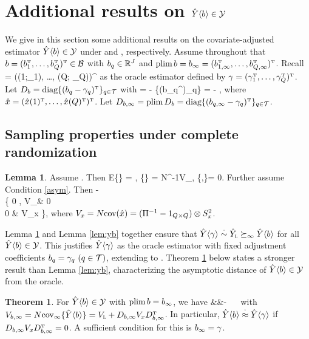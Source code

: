 \documentclass[11pt]{article}
\theoremstyle{definition}
\newtheorem{theorem}{Theorem}
\newtheorem{lemma}{Lemma}
\begin{document}
\section{Additional results on $\hat Y\langle b \rangle\in \mathcal{Y}$}\label{sec:yb_app_add_res}
We give in this section some additional results on the covariate-adjusted estimator $\hat Y\langle b \rangle\in \mathcal{Y}$ under {\cre} and {\rem}, respectively.
Assume throughout that $b = (b_1^{ \mathrm{\scriptscriptstyle T} }, \dots, b_Q^{ \mathrm{\scriptscriptstyle T} })^{ \mathrm{\scriptscriptstyle T} } \in\mathcal{B}$ with $b_q \in \mathbb R^J$ and $\textup{plim\,} b = b_\infty = (b^{ \mathrm{\scriptscriptstyle T} }_{1,\infty}, \ldots, b^{ \mathrm{\scriptscriptstyle T} }_{Q, \infty})^{ \mathrm{\scriptscriptstyle T} }$. %
Recall
\begina
\hyg = (\hy(1;\gamma_1), \ldots, \hy(Q; \gamma_Q))^\T
\enda as the oracle estimator defined by $\gamma =(\gamma_1^{ \mathrm{\scriptscriptstyle T} },\dots, \gamma_Q^{ \mathrm{\scriptscriptstyle T} })^{ \mathrm{\scriptscriptstyle T} }$.
Let 
$D_b   = \text{diag}\{(b_q - \gamma_q)^{ \mathrm{\scriptscriptstyle T} }\}_{q\in\mathcal{T}}$ with  
\begina
\hyba= \hy - \{\diag(b_q^\T)_{q\in\mt}\} \hx =  \hyg - \db   \hx,  
\enda 
where $\hat x = (\hat x(1)^{ \mathrm{\scriptscriptstyle T} }, \ldots, \hat x(Q)^{ \mathrm{\scriptscriptstyle T} })^{ \mathrm{\scriptscriptstyle T} }$. 
Let  
$D_{b, \infty}  = \textup{plim\,} D_b  = \text{diag}\{(b_{q,\infty} - \gamma_q)^{ \mathrm{\scriptscriptstyle T} }\}_{q\in\mathcal{T}}$. 

\subsection{Sampling properties under complete randomization}
\begin{lemma}\label{lem:yg}
Assume {\cre}. Then 
\begina
E\{\hyg\} = \by, \qquad \cov\{\hyg\} =  N^{-1}V_\lin, \qquad \cov\{\hyg ,\hx\}= 0.
\enda
Further assume Condition \ref{asym}. Then 
\begina
\sqrtn \beginp
\hyg - \by\\
\hx
\endp \rs \mn\left\{ 0 , \beginp V_\lin & 0   \\ 0   & V_x \endp \right\},
\enda
where $V_x = N\text{cov}(\hat x) =  (\Pi^{-1}-1_{Q\times Q})  \otimes  S^2_{x}$. 
\end{lemma}

Lemma \ref{lem:yg} and Lemma \ref{lem:yb} together  ensure that $\hat Y\langle\gamma\rangle \overset{\cdot}{\sim} \hat Y_{\textsc{l}} \succeq_\infty \hat Y\langle b \rangle$ for all $\hat Y\langle b \rangle\in\mathcal{Y}$. 
This justifies $\hat Y\langle\gamma\rangle$ as the oracle estimator with fixed adjustment coefficients $b_q = \gamma_q \ ({q\in\mathcal{T}})$, extending \citet[][Example 9]{LD20} to \mes. 
Theorem \ref{thm:optimal_gamma} below states a stronger result than Lemma \ref{lem:yb}, characterizing the asymptotic distance of $\hat Y\langle b \rangle\in \mathcal{Y}$ from the oracle.



\begin{theorem}\label{thm:optimal_gamma} 
{\precre}
For $\hat Y\langle b \rangle\in \mathcal{Y}$ with $\textup{plim\,} b = b_\infty$, we have
\begina
\hyba &\approxi &\hyg - \dbi   \hx  \ \preci \  \hyg
\enda with  $V_{b,\infty} = N\text{cov}_\infty\{\hat Y\langle b \rangle\} = V_{\textsc{l}} + D_{b, \infty} V_x D_{b, \infty}^{ \mathrm{\scriptscriptstyle T} }$. In particular, $\hat Y\langle b \rangle \overset{\cdot}{\approx} \hat Y\langle\gamma\rangle$  if $D_{b, \infty} V_x D_{b, \infty}^{ \mathrm{\scriptscriptstyle T} } = 0$. A sufficient condition for this is $b_\infty = \gamma$.  
\end{theorem}
\end{document}

